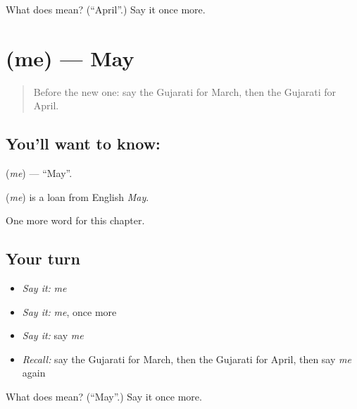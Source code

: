 \begin{tcolorbox}[breakable,colback=teal!4,colframe=teal!35!black,title={Before you move on}]
What does  mean? (\textquotedblleft{}April\textquotedblright{}.) Say it once more.
\end{tcolorbox}
\section[\texorpdfstring{\gu{મે} (me)}{મે (me)}]{ (me) — May}

\label{lesson:GU-C96-me}



\begin{quote}
Before the new one: say the Gujarati for March, then the Gujarati for April.
\end{quote}

\subsection*{You'll want to know: }
\textbf{} (\emph{me}) — \textquotedblleft{}May\textquotedblright{}.

\begin{cousinweb}
\textbf{} (\emph{me}) is a loan from English \emph{May}.
\end{cousinweb}

\begin{grammarlens}[title={What you've built}]
One more word for this chapter.
\end{grammarlens}

\subsection*{Your turn}
\begin{itemize}
\raggedright
  \item \emph{Say it:} \emph{me}
  \item \emph{Say it:} \emph{me}, once more
  \item \emph{Say it:} say \emph{me}
  \item \emph{Recall:} say the Gujarati for March, then the Gujarati for April, then say \emph{me} again
\end{itemize}

\begin{tcolorbox}[breakable,colback=teal!4,colframe=teal!35!black,title={Before you move on}]
What does  mean? (\textquotedblleft{}May\textquotedblright{}.) Say it once more.
\end{tcolorbox}
